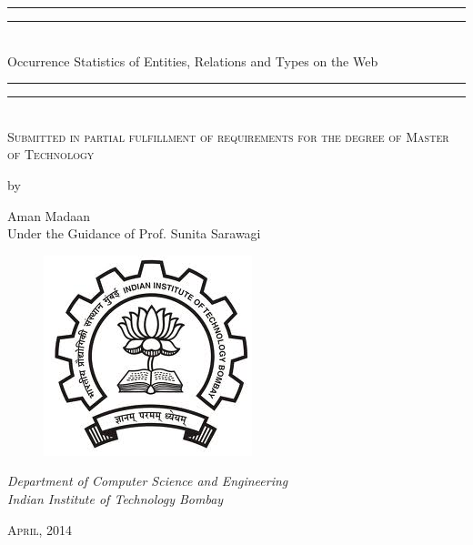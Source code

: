 \documentclass[DIV=calc, paper=a4, fontsize=11pt, twocolumn]{article}
\begin{document}
\begin{titlepage}
    \centering
    \vspace*{\baselineskip}
    \rule{\textwidth}{1.6pt}\vspace*{-\baselineskip}\vspace*{2pt}
    \rule{\textwidth}{0.4pt}\\[\baselineskip]
    {\LARGE Occurrence Statistics of Entities, Relations and Types on the Web}\\[0.2\baselineskip]
    \rule{\textwidth}{0.4pt}\vspace*{-\baselineskip}\vspace{3.2pt}
    \rule{\textwidth}{1.6pt}\\[\baselineskip]
    \scshape
    Submitted in partial fulfillment of requirements for the degree of
    Master of Technology \par
    \vspace*{1\baselineskip}
     by \\[\baselineskip]
    {\Large Aman Madaan \vspace*{1\baselineskip} \\ Under the Guidance of Prof. Sunita Sarawagi\par}
       \begin{figure}[h]
 \centering
 \vspace*{13\baselineskip}
 \includegraphics[bb=0 0 229 220,scale=0.35]{./iitb_logo.jpg}
\end{figure}

    {\vspace*{1\baselineskip} \itshape Department of Computer Science and Engineering \\ Indian Institute of Technology Bombay\par}
    \vfill
 
    {\scshape April, 2014} \\
    {\large }\par
  \end{titlepage}
\tableofcontents
\newpage
\begin{abstract}




\end{abstract}
















\newpage

\end{document}
